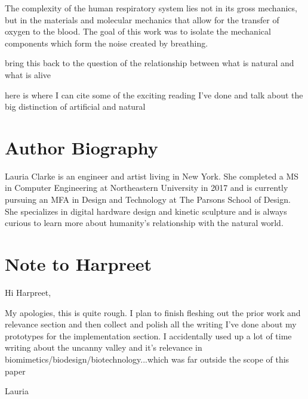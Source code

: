 \documentclass[letterpaper]{article}
\begin{document}
The complexity of the human respiratory system lies not in its gross mechanics, but in the materials and molecular mechanics that allow for the transfer of oxygen to the blood. The goal of this work was to isolate the mechanical components which form the noise created by breathing.  

bring this back to the question of the relationship between what is natural and what is alive

here is where I can cite some of the exciting reading I've done and talk about the big distinction of artificial and natural

\cite{zimmer}
\cite{haraway}
\cite{smith}






%




\section{Author Biography}
Lauria Clarke is an engineer and artist living in New York. She completed a MS in Computer Engineering at Northeastern University in 2017 and is currently pursuing an MFA in Design and Technology at The Parsons School of Design. She specializes in digital hardware design and kinetic sculpture and is always curious to learn more about humanity's relationship with the natural world.


\section{Note to Harpreet}

Hi Harpreet, 

My apologies, this is quite rough. I plan to finish fleshing out the prior work and relevance section and then collect and polish all the writing I've done about my prototypes for the implementation section. I accidentally used up a lot of time writing about the uncanny valley and it's relevance in biomimetics/biodesign/biotechnology...which was far outside the scope of this paper

Lauria
\end{document}
